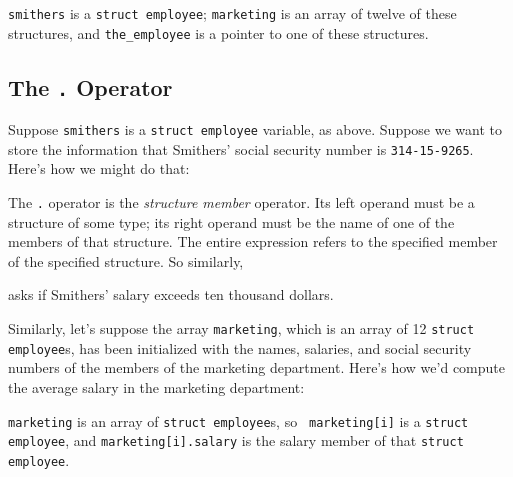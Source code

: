 {\tt smithers} is a {\tt struct employee}; {\tt marketing} is an array
of twelve of these structures, and {\tt the\_employee} is a pointer to
one of these structures.

\subsection{The {\tt .} Operator}

Suppose {\tt smithers} is a {\tt struct employee} variable, as above.
Suppose we want to store the information that Smithers' social security
number is {\tt 314-15-9265}.  Here's how we might do that:

\begin{flushleft}
\verb% smithers.ssn = 314159265; %
\end{flushleft}

The {\tt .} operator is the {\em structure member}\/ operator.  Its left
operand must be a structure of some type; its right operand must be the
name of one of the members of that structure.  The entire expression
refers to the specified member of the specified structure.  So
similarly, 

\begin{flushleft}
\verb% if ( smithers.salary > 10000 ) { %  \\*
\verb%   ... % 
\end{flushleft}

\noindent asks if Smithers' salary exceeds ten thousand dollars. 

Similarly, let's suppose the array {\tt marketing}, which is an array of
12 {\tt struct employee}s, has been initialized with the names,
salaries, and social security numbers of the members of the marketing
department.  Here's how we'd compute the average salary in the marketing
department:  


{\tt marketing} is an array of {\tt struct employee}s, so {\tt
marketing[i]} is a {\tt struct employee}, and {\tt marketing[i].salary}
is the salary member of that {\tt struct employee}. 

